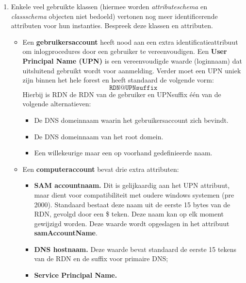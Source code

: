 \documentclass{report}
\newcommand{\vraag}[2]{
	\item #1
	
	#2
}
\begin{document}
\begin{enumerate}
		\vraag { Enkele veel gebruikte klassen (hiermee worden \textit{attributeschema} en \textit{classschema} objecten niet bedoeld) vertonen nog meer identificerende attributen voor hun instanties. Bespreek deze klassen en attributen. } { 		
			\begin{itemize}
				\item Een \textbf{gebruikersaccount} heeft nood aan een extra identificatieattribuut om inlogprocedures door een gebruiker te vereenvoudigen. Een \textbf{User Principal Name (UPN)} is een vereenvoudigde waarde (loginnaam) dat uitsluitend gebruikt wordt voor aanmelding. Verder moet een UPN uniek zijn binnen het hele forest en heeft standaard de volgende vorm:
				$$\texttt{RDN@UPNsuffix}$$
				Hierbij is RDN de RDN van de gebruiker en UPNsuffix één van de volgende alternatieven:
				\begin{itemize}
					\item De DNS domeinnaam waarin het gebruikersaccount zich bevindt.
					\item De DNS domeinnaam van het root domein.
					\item Een willekeurige maar een op voorhand gedefinieerde naam.
				\end{itemize}
				
				\item Een \textbf{computeraccount} bevat drie extra attributen:
				\begin{itemize}
					\item \textbf{SAM accountnaam.} Dit is gelijkaardig aan het UPN attribuut, maar dient voor compatibiliteit met oudere windows systemen (pre 2000). Standaard bestaat deze naam uit de eerste 15 bytes van de RDN, gevolgd door een \$ teken. Deze naam kan op elk moment gewijzigd worden. Deze waarde wordt opgeslagen in het attribuut \textbf{samAccountName}.
					\item \textbf{DNS hostnaam.} Deze waarde bevat standaard de eerste 15 tekens van de RDN en de suffix voor primaire DNS;
					\item \textbf{Service Principal Name.}
				\end{itemize}
		\end{itemize}}
		

\end{enumerate}
\end{document}
